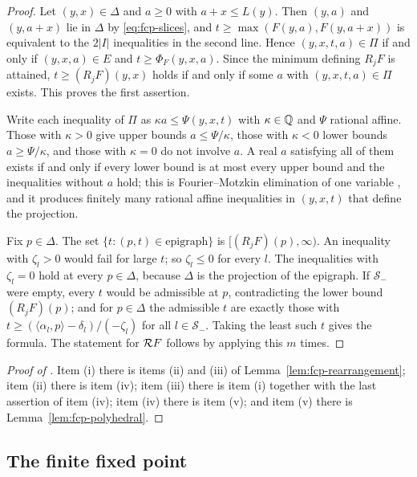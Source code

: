 \begin{proof}
Let $(y,x)\in\Delta$ and $a\ge0$ with $a+x\le L(y)$. Then $(y,a)$ and $(y,a+x)$ lie in $\Delta$ by
\eqref{eq:fcp-slices}, and $t\ge\max(F(y,a),F(y,a+x))$ is equivalent to the $2|I|$ inequalities in the second line.
Hence $(y,x,t,a)\in\Pi$ if and only if $(y,x,a)\in E$ and $t\ge\Phi_F(y,x,a)$. Since the minimum defining $R_jF$ is
attained, $t\ge(R_jF)(y,x)$ holds if and only if some $a$ with $(y,x,t,a)\in\Pi$ exists. This proves the first
assertion.

Write each inequality of $\Pi$ as $\kappa a\le\Psi(y,x,t)$ with $\kappa\in\mathbb{Q}$ and $\Psi$ rational affine. Those with
$\kappa>0$ give upper bounds $a\le\Psi/\kappa$, those with $\kappa<0$ lower bounds $a\ge\Psi/\kappa$, and those with
$\kappa=0$ do not involve $a$. A real $a$ satisfying all of them exists if and only if every lower bound is at most every
upper bound and the inequalities without $a$ hold; this is Fourier--Motzkin elimination of one variable
\cite[\S12.2]{Schrijver1986}, and it produces finitely many rational affine inequalities in $(y,x,t)$ that define the
projection.

Fix $p\in\Delta$. The set $\{t:(p,t)\in\text{epigraph}\}$ is $[(R_jF)(p),\infty)$. An inequality with $\zeta_l>0$
would fail for large $t$; so $\zeta_l\le0$ for every $l$. The inequalities with $\zeta_l=0$ hold at every
$p\in\Delta$, because $\Delta$ is the projection of the epigraph. If $\mathcal S_-$ were empty, every $t$ would be
admissible at $p$, contradicting the lower bound $(R_jF)(p)$; and for $p\in\Delta$ the admissible $t$ are exactly
those with $t\ge(\langle\alpha_l,p\rangle-\delta_l)/(-\zeta_l)$ for all $l\in\mathcal S_-$. Taking the least such $t$
gives the formula. The statement for $\mathcal{R} F$ follows by applying this $m$ times.
\end{proof}

\begin{proof}[Proof of ]
Item (i) there is items (ii) and (iii) of Lemma~\ref{lem:fcp-rearrangement}; item (ii) there is item (iv);
item (iii) there is item (i) together with the last assertion of item (iv); item (iv) there is item (v); and item (v)
there is Lemma~\ref{lem:fcp-polyhedral}.
\end{proof}

\subsection{The finite fixed point}\label{sec:fcp-fixed}

